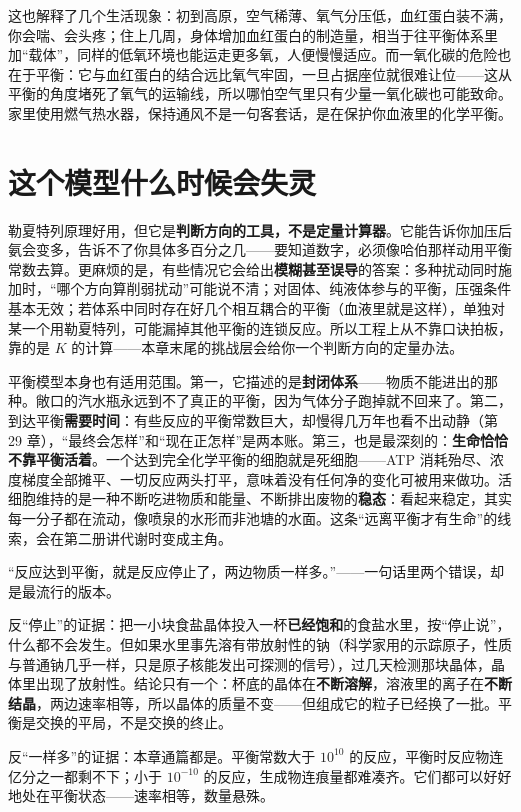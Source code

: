 这也解释了几个生活现象：初到高原，空气稀薄、氧气分压低，血红蛋白装不满，你会喘、会头疼；住上几周，身体增加血红蛋白的制造量，相当于往平衡体系里加“载体”，同样的低氧环境也能运走更多氧，人便慢慢适应。而一氧化碳的危险也在于平衡：它与血红蛋白的结合远比氧气牢固，一旦占据座位就很难让位——这从平衡的角度堵死了氧气的运输线，所以哪怕空气里只有少量一氧化碳也可能致命。家里使用燃气热水器，保持通风不是一句客套话，是在保护你血液里的化学平衡。

\section{这个模型什么时候会失灵}

勒夏特列原理好用，但它是\textbf{判断方向的工具，不是定量计算器}。它能告诉你加压后氨会变多，告诉不了你具体多百分之几——要知道数字，必须像哈伯那样动用平衡常数去算。更麻烦的是，有些情况它会给出\textbf{模糊甚至误导}的答案：多种扰动同时施加时，“哪个方向算削弱扰动”可能说不清；对固体、纯液体参与的平衡，压强条件基本无效；若体系中同时存在好几个相互耦合的平衡（血液里就是这样），单独对某一个用勒夏特列，可能漏掉其他平衡的连锁反应。所以工程上从不靠口诀拍板，靠的是 $K$ 的计算——本章末尾的挑战层会给你一个判断方向的定量办法。

平衡模型本身也有适用范围。第一，它描述的是\textbf{封闭体系}——物质不能进出的那种。敞口的汽水瓶永远到不了真正的平衡，因为气体分子跑掉就不回来了。第二，到达平衡\textbf{需要时间}：有些反应的平衡常数巨大，却慢得几万年也看不出动静（第 29 章），“最终会怎样”和“现在正怎样”是两本账。第三，也是最深刻的：\textbf{生命恰恰不靠平衡活着}。一个达到完全化学平衡的细胞就是死细胞——ATP 消耗殆尽、浓度梯度全部摊平、一切反应两头打平，意味着没有任何净的变化可被用来做功。活细胞维持的是一种不断吃进物质和能量、不断排出废物的\textbf{稳态}：看起来稳定，其实每一分子都在流动，像喷泉的水形而非池塘的水面。这条“远离平衡才有生命”的线索，会在第二册讲代谢时变成主角。

\begin{wuqu}
“反应达到平衡，就是反应停止了，两边物质一样多。”——一句话里两个错误，却是最流行的版本。

反“停止”的证据：把一小块食盐晶体投入一杯\textbf{已经饱和}的食盐水里，按“停止说”，什么都不会发生。但如果水里事先溶有带放射性的钠（科学家用的示踪原子，性质与普通钠几乎一样，只是原子核能发出可探测的信号），过几天检测那块晶体，晶体里出现了放射性。结论只有一个：杯底的晶体在\textbf{不断溶解}，溶液里的离子在\textbf{不断结晶}，两边速率相等，所以晶体的质量不变——但组成它的粒子已经换了一批。平衡是交换的平局，不是交换的终止。

反“一样多”的证据：本章通篇都是。平衡常数大于 $10^{10}$ 的反应，平衡时反应物连亿分之一都剩不下；小于 $10^{-10}$ 的反应，生成物连痕量都难凑齐。它们都可以好好地处在平衡状态——速率相等，数量悬殊。
\end{wuqu}

